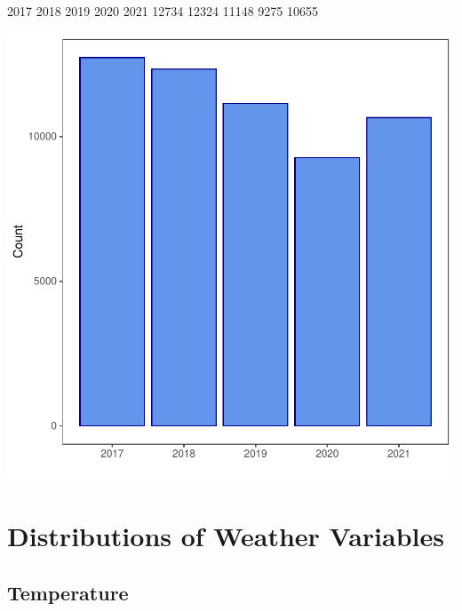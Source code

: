 \documentclass[11pt, a4paper]{article}
\begin{document}
\begin{Schunk}
\begin{Soutput}
 2017  2018  2019  2020  2021 
12734 12324 11148  9275 10655 
\end{Soutput}
\end{Schunk}
\includegraphics{variableinvestigation-006}





\pagebreak
\section{Distributions of Weather Variables}

\subsection{Temperature}
\end{document}
